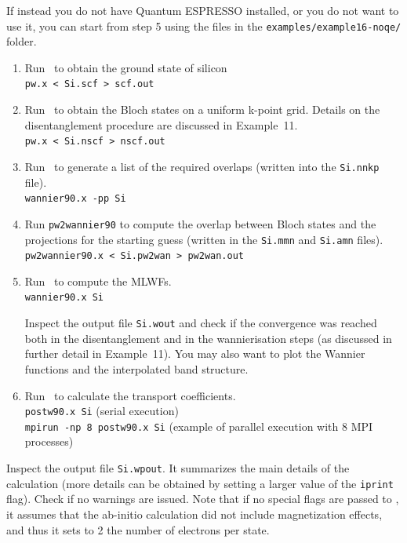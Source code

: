 \documentclass[a4paper,11pt,twoside]{article}
\begin{document}
If instead you do not have Quantum ESPRESSO installed, or you do not want to
use it, you can start from step 5 using the files in the
{\tt examples/example16-noqe/} folder.

\begin{enumerate}
\item Run \pwscf\ to obtain the ground state of silicon\\
{\tt pw.x < Si.scf > scf.out}

\item Run \pwscf\ to obtain the Bloch states on a uniform k-point
  grid. Details on the disentanglement procedure are discussed in Example~11.\\ 
{\tt pw.x < Si.nscf > nscf.out}

\item Run \wannier\ to generate a list of the required overlaps (written
  into the {\tt Si.nnkp} file).\\
{\tt wannier90.x -pp Si}

\item Run {\tt pw2wannier90} to compute the overlap between Bloch
  states and the projections for the starting guess (written in the
  {\tt Si.mmn} and {\tt  Si.amn} files).\\
{\tt pw2wannier90.x < Si.pw2wan > pw2wan.out}

\item Run \wannier\ to compute the MLWFs.\\
{\tt wannier90.x Si}

Inspect the output file {\tt Si.wout} and check if the convergence was reached both in the
disentanglement and in the wannierisation steps (as discussed in further detail in Example~11).
You may also want to plot the Wannier functions and the interpolated band structure.

\item Run \postw\ to calculate the transport coefficients.\\
{\tt postw90.x Si} (serial execution) \\
{\tt mpirun -np 8 postw90.x Si} (example of parallel execution with 8
MPI processes) 
\end{enumerate}

Inspect the output file {\tt Si.wpout}. It summarizes the main details of the calculation (more details can be obtained by setting a larger value of the \verb#iprint# flag). 
Check if no warnings are issued. Note that if no special flags are passed to \bw, it assumes that
the ab-initio calculation did not include magnetization effects, and thus it sets to 2 the
number of electrons per state.
\end{document}
